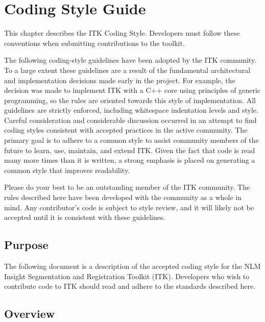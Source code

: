 \chapter{Coding Style Guide}
\label{ch:CodingStyleGuide}

This chapter describes the ITK Coding Style. Developers must follow these
conventions when submitting contributions to the toolkit.

The following coding-style guidelines have been adopted by the ITK community.
To a large extent these guidelines are a result of the fundamental
architectural and implementation decisions made early in the project. For
example, the decision was made to implement ITK with a C++ core using
principles of generic programming, so the rules are oriented towards this style
of implementation. All guidelines are strictly enforced, including whitespace
indentation levels and style. Careful consideration and considerable discussion
occurred in an attempt to find coding
styles consistent with accepted practices in the active community.
The primary goal is to adhere to a common
style to assist community members of the future to learn, use, maintain, and
extend ITK. Given the fact that code is read many more times than it is written, a strong
emphasis is placed on generating a common style that improves readability.

Please do your best to be an outstanding member of the ITK community. The rules
described here have been developed with the community as a whole in mind.
Any contributor's code is subject to style review, and it will likely not be
accepted until it is consistent with these guidelines.


\section{Purpose}
\label{sec:Purpose}

The following document is a description of the accepted coding style for the
NLM Insight Segmentation and Registration Toolkit (ITK). Developers who wish
to contribute code to ITK should read and adhere to the standards described
here.


\section{Overview}
\label{sec:Overview}

